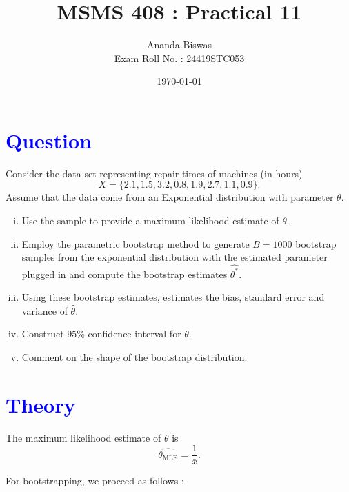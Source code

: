 \documentclass[11pt, a4paper]{article}\usepackage[]{graphicx}\usepackage[]{xcolor}
\title{MSMS 408 : Practical 11}
\author{{\fontsize{22}{20} \benyorithafont Ananda Biswas} \\[1em] Exam Roll No. : 24419STC053}
\date{\today}
\begin{document}
\maketitle


\section*{\faArrowAltCircleRight[regular] \textcolor{blue}{Question}}

\hspace{1cm} Consider the data-set representing repair times of machines (in hours) $$X = \{2.1, 1.5, 3.2, 0.8, 1.9, 2.7, 1.1, 0.9\}.$$ Assume that the data come from an Exponential distribution with parameter $\theta$.

\begin{enumerate}[(i)]
\item Use the sample to provide a maximum likelihood estimate of $\theta$.

\item Employ the parametric bootstrap method to generate $B = 1000$ bootstrap samples from the exponential distribution with the estimated parameter plugged in and compute the bootstrap estimates $\widehat{\theta^*}$.

\item Using these bootstrap estimates, estimates the bias, standard error and variance of $\widehat{\theta}$.

\item Construct $95\%$ confidence interval for $\theta$.

\item Comment on the shape of the bootstrap distribution.
\end{enumerate}

\section*{\faArrowAltCircleRight[regular] \textcolor{blue}{Theory}}

The maximum likelihood estimate of $\theta$ is $$\widehat{\theta_{\text{MLE}}} = \dfrac{1}{\bar{x}}.$$

For bootstrapping, we proceed as follows :
\end{document}
